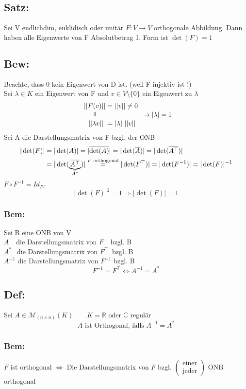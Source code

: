 \documentclass[titlepage,12pt,a4paper,ngerman]{report}
\newcommand{\verteq}{\rotatebox{90}{$\,=$}}
\newcommand{\equalto}[2]{\underset{\scriptstyle\overset{\mkern4mu\verteq}{#2}}{#1}}
\newcommand{\tx}[1]{\textrm{#1}}
\newcommand{\ub}[1]{\underbrace{#1}}
\begin{document}
\subsection{Satz:}
Sei V endlichdim, euklidisch oder unitär $ F:V\to V $ orthogonale Abbildung. Dann haben alle Eigenwerte von F Absolutbetrag 1. Form ist $ \det(F) = 1 $

\subsection{Bew:}
Beachte, dass 0 kein Eigenwert von D ist. (weil F injektiv ist !)\\
Sei $ \lambda \in K $ ein Eigenwert von F und $ v \in V \setminus \{0\} $ ein Eigenwert zu $ \lambda $
$$ \begin{array}{cc}
\equalto{||F(v)||}{} = ||v|| \neq 0\\
\ ||\lambda v || \ = | \lambda | \ ||v||
\end{array} \rightarrow |\lambda| = 1$$
Sei A die Darstellungsmatrix von F bzgl. der ONB
\begin{align*}
|\det(F)| &= |\det(A)| = |\overline{\det(A)}| = |\det(\overline{A})| = |\det(\overline{A^\top})| \\
&= | \det(\ub{\overline{A^\top}}_{A^*})| \buildrel F \tx{ orthogonal} \over = |\det(F^\top)| = |\det(F^{-1})| = | \det(F)|^{-1}
\end{align*}
$ F\circ F^{-1} = Id_{IV} $\\
$$|\det(F)|^2 = 1 \Rightarrow |\det(F)| = 1$$

\subsubsection{Bem:}
Sei B eine ONB von V\\
$A \ \ \;$  die Darstellungsmatrix von $F \ \ \; $ bzgl. B\\
$ A^* \ \:$ die Darstellungsmatrix von $ F^\top \ $ bzgl. B\\
$ A^{-1} $ die Darstellungsmatrix von $ F^{-1} $ bzgl. B
$$F^{-1} = F^\top \Leftrightarrow A^{-1} = A^*$$

\subsection{Def:}
Sei $A \in \mathcal M_{(n \times n)} (K) \qquad K = \mathbb{R} \tx{ oder } \mathbb{C}$ regulär 
$$A \tx{ ist Orthogonal, falls } A^{-1} = A^*$$
\subsubsection{Bem:}
$F$ ist orthogonal $\Leftrightarrow$ Die Darstellungsmatrix von $F$ bzgl. $\begin{pmatrix}
\tx{einer} \\ \tx{jeder}
\end{pmatrix}$ ONB orthogonal
\end{document}
